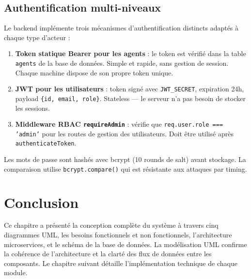 \subsection{Authentification multi-niveaux}

Le backend implémente trois mécanismes d'authentification distincts adaptés à chaque
type d'acteur :

\begin{enumerate}
  \item \textbf{Token statique Bearer pour les agents} : le token est vérifié dans la
        table \texttt{agents} de la base de données. Simple et rapide, sans gestion de
        session. Chaque machine dispose de son propre token unique.

  \item \textbf{JWT pour les utilisateurs} : token signé avec \texttt{JWT\_SECRET},
        expiration 24h, payload \texttt{\{id, email, role\}}. Stateless — le serveur
        n'a pas besoin de stocker les sessions.

  \item \textbf{Middleware RBAC \texttt{requireAdmin}} : vérifie que
        \texttt{req.user.role === 'admin'} pour les routes de gestion des utilisateurs.
        Doit être utilisé après \texttt{authenticateToken}.
\end{enumerate}

Les mots de passe sont hashés avec bcrypt (10 rounds de salt) avant stockage. La
comparaison utilise \texttt{bcrypt.compare()} qui est résistante aux attaques par timing.

\section{Conclusion}

Ce chapitre a présenté la conception complète du système à travers cinq diagrammes UML,
les besoins fonctionnels et non fonctionnels, l'architecture microservices, et le schéma
de la base de données. La modélisation UML confirme la cohérence de l'architecture et la
clarté des flux de données entre les composants. Le chapitre suivant détaille
l'implémentation technique de chaque module.
